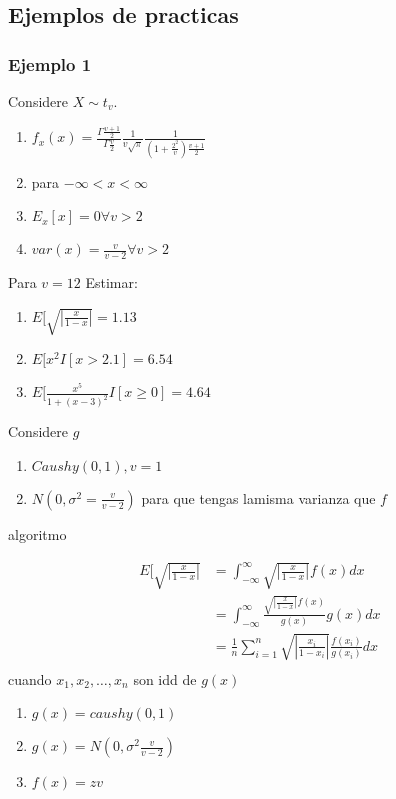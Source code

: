 \documentclass[10pt, oneside]{article}
\begin{document}
\subsection{Ejemplos de practicas}

\subsubsection{Ejemplo 1}
Considere $X \sim t_v$.
\begin{enumerate}
	\item $f_x(x) = \frac{\Gamma \frac{v+1}{2}}{\Gamma \frac{v}{2}} \frac{1}{v \sqrt{\pi}} \frac{1}{(1 + \frac{2^2}{v})\frac{v + 1}{2}}$
	\item para $-\infty < x < \infty$
	\item $E_x[x] = 0 \forall v > 2$
	\item $var(x) = \frac{v}{v-2} \forall v > 2$
\end{enumerate}

Para $v=12$ Estimar:

\begin{enumerate}
	\item $E[\sqrt{|\frac{x}{1-x}|} = 1.13$
	\item $E[x^2 I[x > 2.1] = 6.54$
	\item $E[\frac{x^5}{1 + (x-3)^2}I[x \geq 0] = 4.64$
\end{enumerate}

Considere $g$
\begin{enumerate}
	\item $Caushy(0,1), v=1$
	\item $N(0,\sigma^2 = \frac{v}{v-2})$ para que tengas lamisma varianza que $f$
\end{enumerate}

algoritmo

\[
	\begin{split}
		E[\sqrt{|\frac{x}{1-x}|} & = \int_{-\infty}^{\infty} \sqrt{|\frac{x}{1-x}|} f(x) dx                        \\
		                         & = \int_{-\infty}^{\infty} \frac{\sqrt{|\frac{x}{1-x}|}f(x)}{g(x)} g(x) dx       \\
		                         & = \frac{1}{n} \sum_{i=1}^{n} \sqrt{|\frac{x_i}{1-x_i}|}\frac{f(x_i)}{g(x_i)} dx \\
	\end{split}
\]
cuando $x_1, x_2, \ldots, x_n$ son idd de $g(x)$
\begin{enumerate}
	\item $g(x) = caushy(0,1)$
	\item $g(x) = N(0,\sigma^2 \frac{v}{v-2})$
	\item $f(x) = zv$
\end{enumerate}
\end{document}
